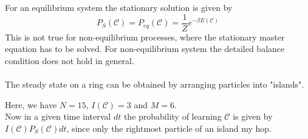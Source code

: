 For an equilibrium system the stationary solution is given by
\begin{equation*}
	P_S(\mathcal{C})=P_{eq}(\mathcal{C})=\frac{1}{Z}e^{-\beta E(\mathcal{C})}
\end{equation*}
This is not true for non-equilibrium processes, where the stationary master equation has to be solved. For non-equilibrium system the detailed balance condition does not hold in general.\vspace{2mm}\\
\textbf{\underline{}}\vspace{3mm}\\
The steady state on a ring can be obtained by arranging particles into "{}islands".
\begin{figure}[H]
	\centering
\end{figure}
\noindent Here, we have $N=15$, $I(\mathcal{C})=3$ and $M=6$.\\
Now in a given time interval $dt$ the probability of learning $\mathcal{C}$ is given by $I(\mathcal{C})P_S(\mathcal{C})dt$, since only the rightmost particle of an island my hop.\\
